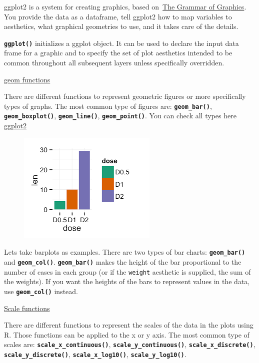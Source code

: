 \documentclass[
  letterpaper,
  DIV=11,
  numbers=noendperiod]{scrartcl}
\begin{document}
ggplot2 is a system for creating graphics, based
on~\href{https://www.amazon.com/Grammar-Graphics-Statistics-Computing/dp/0387245448/ref=as_li_ss_tl}{The
Grammar of Graphics}. You provide the data as a dataframe, tell ggplot2
how to map variables to aesthetics, what graphical geometries to use,
and it takes care of the details.

\textbf{\texttt{ggplot()}} initializes a ggplot object. It can be used
to declare the input data frame for a graphic and to specify the set of
plot aesthetics intended to be common throughout all subsequent layers
unless specifically overridden.

\ul{geom functions}

There are different functions to represent geometric figures or more
specifically types of graphs. The most common type of figures are:
\textbf{\texttt{geom\_bar()}}, \textbf{\texttt{geom\_boxplot()}},
\textbf{\texttt{geom\_line()}}, \textbf{\texttt{geom\_point()}}. You can
check all types here \href{https://ggplot2.tidyverse.org}{ggplot2}

\begin{figure}[h]

{\centering \includegraphics{barplot.png}

}

\end{figure}

Lets take barplots as examples. There are two types of bar charts:
\textbf{\texttt{geom\_bar()}} and \textbf{\texttt{geom\_col()}}.
\textbf{\texttt{geom\_bar()}} makes the height of the bar proportional
to the number of cases in each group (or if the \texttt{weight}
aesthetic is supplied, the sum of the weights). If you want the heights
of the bars to represent values in the data, use
\textbf{\texttt{geom\_col()}} instead.

\ul{Scale functions}

There are different functions to represent the scales of the data in the
plots using R. Those functions can be applied to the x or y axis. The
most common type of scales are:
\textbf{\texttt{scale\_x\_continuous()}},
\textbf{\texttt{scale\_y\_continuous()}},
\textbf{\texttt{scale\_x\_discrete()}},
\textbf{\texttt{scale\_y\_discrete()}},
\textbf{\texttt{scale\_x\_log10()}},
\textbf{\texttt{scale\_y\_log10()}}.
\end{document}
